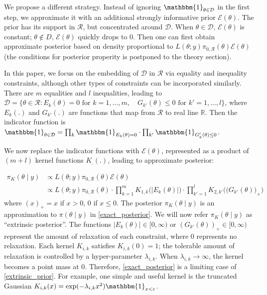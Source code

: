 \documentclass[10pt]{article}
\newcommand{\mc}[1]{\mathcal{#1}}
\begin{document}
We propose a different strategy. Instead of ignoring $\mathbbm{1}_{\theta\in \mc D} $ in the first step, we approximate it with an additional strongly informative prior $\mc E(\theta)$. The prior has its support in $\mc R$, but concentrated around $\mc D$. When $\theta \in \mc D$, $\mc E(\theta)$ is constant; $\theta \not\in D$, $\mc E(\theta)$ quickly drops to $0$. Then one can first obtain approximate posterior based on density proportional to $L(\theta;y)\pi_{0,\mc R}(\theta)\mc E(\theta)$ (the conditions for posterior properity is postponed to the theory section).

In this paper, we focus on the embedding of $\mc D$ in $\mc R$ via equality and inequality constraints, although other types of constraints can be incorporated similarly. There are $m$ equalities and $l$ inequalities, leading to $\mc D = \{ \theta \in \mc R: E_k(\theta)=0 \text{ for } k=1,\ldots,m, \quad G_{k'}(\theta)\le 0  \text{ for } k'=1,\ldots,l \}$, where $E_k(.)$ and $G_{k'}(.)$ are functions that map from $\mc R$ to real line $\mathbb R$. Then the indicator function is $\mathbbm{1}_{\theta\in \mc D} = \prod_k \mathbbm{1}_{E_k(\theta)=0} \cdot \prod_{k'}\mathbbm{1}_{G_k'(\theta)\le 0}$.


We now replace the indicator functions with $\mc E(\theta)$, represented as a product of $(m+l)$ kernel functions $K_.(.)$, leading to approximate posterior:

\begin{equation}
\begin{aligned}
\label{extrinsic_prior}
\pi_{K}(\theta \mid y) & \propto L(\theta;y)\pi_{0,\mc R}(\theta) \mc E(\theta) \\
&\propto L(\theta;y)\pi_{0,\mc R}(\theta) \cdot \prod_{k=1}^{m} K_{1,k}\Big( | E_k(\theta)| \Big) \cdot \prod_{k'=1}^{l} K_{2,k'}\Big( \big( G_{k'}(\theta) \big)_+ \Big)
\end{aligned}
\end{equation}
where $(x)_+ = x$ if $x>0$, $0$ if $x\le 0$. The posterior $\pi_{K}(\theta \mid y)$ is an approximation to $\pi(\theta \mid y)$ in \eqref{exact_posterior}. We will now refer $\pi_{K}(\theta \mid y)$ as ``extrinsic posterior''. The functions $|E_k(\theta)|\in [0,\infty)$ or $(G_{k'}(\theta))_+ \in [0,\infty)$ represent the amount of relaxation of each constraint, where $0$ represents no relaxation. Each kernel $K_{i,k}$ satisfies $K_{i,k}(0)=1$; the tolerable amount of relaxation is controlled by a hyper-parameter $\lambda_{i,k}$. When $\lambda_{i,k} \rightarrow \infty$, the kernel becomes a point mass at $0$. Therefore, \eqref{exact_posterior} is a limiting case of \eqref{extrinsic_prior}. For example, one simple and useful kernel is the truncated Gaussian $K_{i,k}(x) = \exp( -{\lambda_{i,k} x^2}) \mathbbm{1}_{x<\varepsilon}$.
\end{document}
